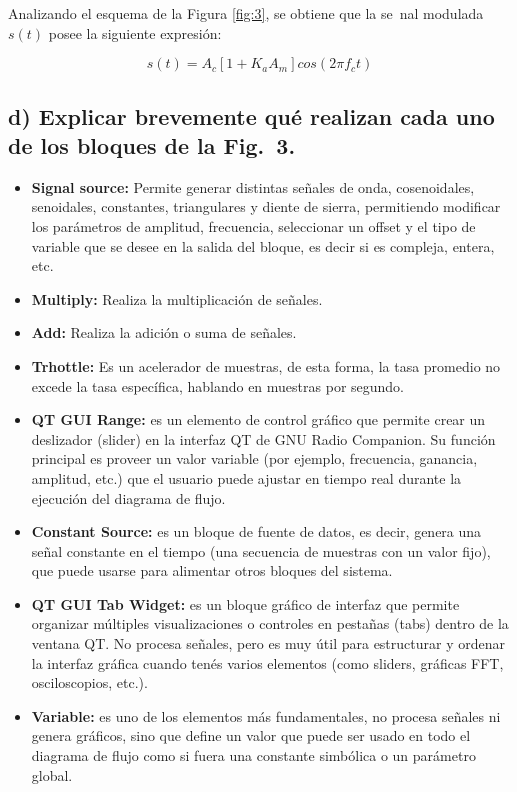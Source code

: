 Analizando el esquema de la Figura \ref{fig:3}, se obtiene que la se~nal modulada $s(t)$ posee la siguiente expresión:

    $$s(t) = A_c [1 + K_aA_m]cos(2\pi f_c t)$$

\subsection*{d) Explicar brevemente qué realizan cada uno de los bloques de la Fig.~3.}

\begin{itemize}
    \item \textbf{Signal source:} Permite generar distintas señales de onda, cosenoidales, senoidales, constantes, triangulares y diente de sierra, permitiendo modificar los parámetros de amplitud, frecuencia, seleccionar un offset y el tipo de variable que se desee en la salida del bloque, es decir si es compleja, entera, etc.
    \item \textbf{Multiply:} Realiza la multiplicación de señales.
    \item \textbf{Add:} Realiza la adición o suma de señales.
    \item \textbf{Trhottle:} Es un acelerador de muestras, de esta forma, la tasa promedio no excede la tasa específica, hablando en muestras por segundo.
    \item \textbf{QT GUI Range:} es un elemento de control gráfico que permite crear un deslizador (slider) en la interfaz QT de GNU Radio Companion. Su función principal es proveer un valor variable (por ejemplo, frecuencia, ganancia, amplitud, etc.) que el usuario puede ajustar en tiempo real durante la ejecución del diagrama de flujo.
    \item \textbf{Constant Source:} es un bloque de fuente de datos, es decir, genera una señal constante en el tiempo (una secuencia de muestras con un valor fijo), que puede usarse para alimentar otros bloques del sistema.
    \item \textbf{QT GUI Tab Widget:} es un bloque gráfico de interfaz que permite organizar múltiples visualizaciones o controles en pestañas (tabs) dentro de la ventana QT. No procesa señales, pero es muy útil para estructurar y ordenar la interfaz gráfica cuando tenés varios elementos (como sliders, gráficas FFT, osciloscopios, etc.).
    \item \textbf{Variable:} es uno de los elementos más fundamentales, no procesa señales ni genera gráficos, sino que define un valor que puede ser usado en todo el diagrama de flujo como si fuera una constante simbólica o un parámetro global.

\end{itemize}
